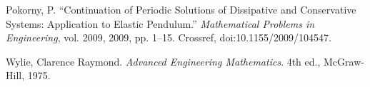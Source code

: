 \begin{thebibliography}{99}



Pokorny, P. “Continuation of Periodic Solutions of Dissipative and Conservative Systems: Application to Elastic Pendulum.” \emph{Mathematical Problems in Engineering}, vol. 2009, 2009, pp. 1–15. Crossref, doi:10.1155/2009/104547.








Wylie, Clarence Raymond. \emph{Advanced Engineering Mathematics}. 4th ed., McGraw-Hill, 1975.



\end{thebibliography}
